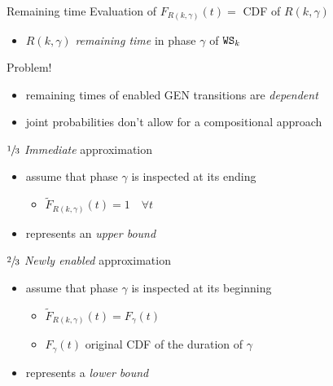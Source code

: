     \begin{frame}{Remaining time}
      Evaluation of $F_{R(k,\gamma)}(t) = $ CDF of $R(k,\gamma)$
      \begin{itemize}
        \item $R(k,\gamma)$ \textit{remaining time} in phase $\gamma$ of $\mathtt{WS}_k$
      \end{itemize}
      
      \vspace{1em}
      Problem!
      \begin{itemize}
        \item remaining times of enabled GEN transitions are \textit{dependent}
        \item joint probabilities don't allow for a compositional approach
      \end{itemize}
      
      \vspace{1em}
      $\sfrac{1}{3}$ \textit{Immediate} approximation
      \begin{itemize}
        \item assume that phase $\gamma$ is inspected at its ending
        \begin{itemize}
          \item $\tilde{F}_{R(k, \gamma)}(t) = 1 \quad \forall t$
        \end{itemize}
        \item represents an \textit{upper bound}
      \end{itemize}
      
      \vspace{1em}
      $\sfrac{2}{3}$ \textit{Newly enabled} approximation
      \begin{itemize}
        \item assume that phase $\gamma$ is inspected at its beginning
        \begin{itemize}
          \item $\tilde{F}_{R(k, \gamma)}(t) = F_{\gamma}(t)$ 
          \item $F_{\gamma}(t)$ original CDF of the duration of $\gamma$
        \end{itemize}
        \item represents a \textit{lower bound}
      \end{itemize}
    \end{frame}
    
